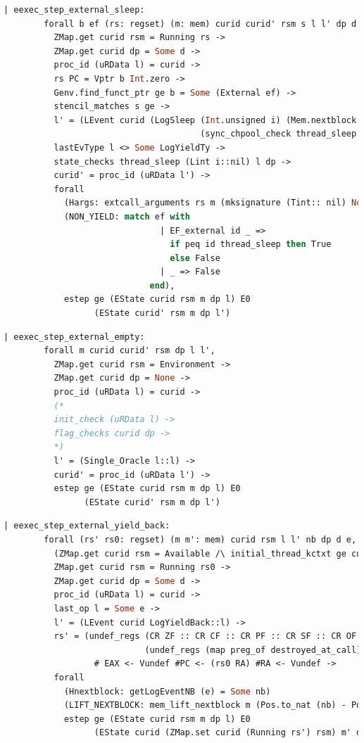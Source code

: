 \begin{lstlisting}[language=Caml]
    | eexec_step_external_sleep:
        forall b ef (rs: regset) (m: mem) curid curid' rsm s l l' dp d i,
          ZMap.get curid rsm = Running rs ->
          ZMap.get curid dp = Some d ->
          proc_id (uRData l) = curid ->
          rs PC = Vptr b Int.zero ->
          Genv.find_funct_ptr ge b = Some (External ef) ->
          stencil_matches s ge ->
          l' = (LEvent curid (LogSleep (Int.unsigned i) (Mem.nextblock m)
                                       (sync_chpool_check thread_sleep ((Lint i)::nil) (uRData l) d))::l) ->
          lastEvType l <> Some LogYieldTy ->
          state_checks thread_sleep (Lint i::nil) l dp ->
          curid' = proc_id (uRData l') ->
          forall
            (Hargs: extcall_arguments rs m (mksignature (Tint:: nil) None cc_default) (Vint i:: nil))
            (NON_YIELD: match ef with
                               | EF_external id _ => 
                                 if peq id thread_sleep then True
                                 else False
                               | _ => False
                             end),
            estep ge (EState curid rsm m dp l) E0
                  (EState curid' rsm m dp l')
\end{lstlisting}


\begin{lstlisting}[language=Caml]
    | eexec_step_external_empty:
        forall m curid curid' rsm dp l l',
          ZMap.get curid rsm = Environment ->
          ZMap.get curid dp = None ->
          proc_id (uRData l) = curid ->
          (*
          init_check (uRData l) ->
          flag_checks curid dp ->
          *)
          l' = (Single_Oracle l::l) ->
          curid' = proc_id (uRData l') ->
          estep ge (EState curid rsm m dp l) E0
                (EState curid' rsm m dp l')
\end{lstlisting}

\begin{lstlisting}[language=Caml]
    | eexec_step_external_yield_back:
        forall (rs' rs0: regset) (m m': mem) curid rsm l l' nb dp d e,
          (ZMap.get curid rsm = Available /\ initial_thread_kctxt ge curid l = Some rs0) \/
          ZMap.get curid rsm = Running rs0 ->
          ZMap.get curid dp = Some d ->
          proc_id (uRData l) = curid ->
          last_op l = Some e ->
          l' = (LEvent curid LogYieldBack::l) ->
          rs' = (undef_regs (CR ZF :: CR CF :: CR PF :: CR SF :: CR OF :: nil)
                            (undef_regs (map preg_of destroyed_at_call) rs0)) 
                  # EAX <- Vundef #PC <- (rs0 RA) #RA <- Vundef ->
          forall
            (Hnextblock: getLogEventNB (e) = Some nb)
            (LIFT_NEXTBLOCK: mem_lift_nextblock m (Pos.to_nat (nb) - Pos.to_nat (Mem.nextblock m) % nat) = m'),
            estep ge (EState curid rsm m dp l) E0
                  (EState curid (ZMap.set curid (Running rs') rsm) m' dp l').
\end{lstlisting}


